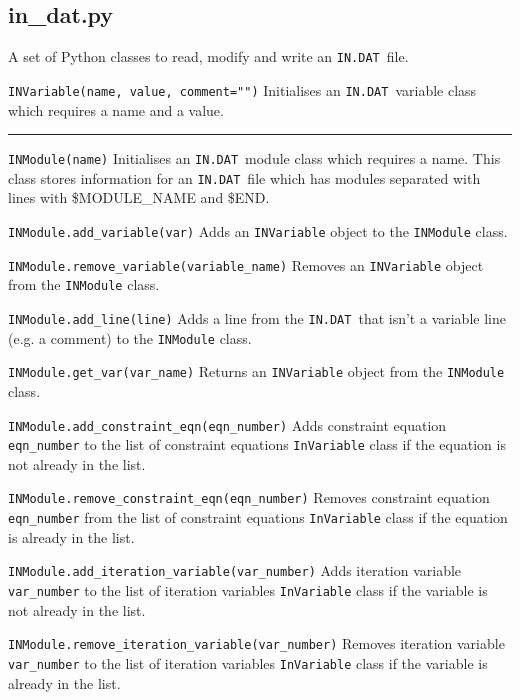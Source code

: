 \documentclass[11pt,a4paper]{article}
\newcommand{\indat}{\mbox{\texttt{IN.DAT}}}
\begin{document}
\subsection{in\_dat.py}

A set of Python classes to read, modify and write an \indat\ file.

\begin{description}

\item{\verb|INVariable(name, value, comment="")| } Initialises an \indat\
  variable class which requires a name and a value.

\end{description}

\rule{\textwidth}{0.4pt}

\begin{description}

\item{\verb|INModule(name)|} Initialises an \indat\ module class which
  requires a name. This class stores information for an \indat\ file which has
  modules separated with lines with \$MODULE\_NAME and \$END.

\item{\verb|INModule.add_variable(var)|} Adds an \verb|INVariable| object to
  the \verb|INModule| class.

\item{\verb|INModule.remove_variable(variable_name)|} Removes an
  \verb|INVariable| object from the \verb|INModule| class.

\item{\verb|INModule.add_line(line)|} Adds a line from the \indat\ that isn't
  a variable line (e.g. a comment) to the \verb|INModule| class.

\item{\verb|INModule.get_var(var_name)|} Returns an \verb|INVariable| object
  from the \verb|INModule| class.

\item{\verb|INModule.add_constraint_eqn(eqn_number)|} Adds constraint
  equation \verb|eqn_number| to the list of constraint equations
  \verb|InVariable| class if the equation is not already in the list.

\item{\verb|INModule.remove_constraint_eqn(eqn_number)|} Removes
  constraint equation \verb|eqn_number| from the list of constraint
  equations \verb|InVariable| class if the equation is already in the list.

\item{\verb|INModule.add_iteration_variable(var_number)|} Adds iteration
  variable \verb|var_number| to the list of iteration variables
  \verb|InVariable| class if the variable is not already in the list.

\item{\verb|INModule.remove_iteration_variable(var_number)|} Removes
  iteration variable \verb|var_number| to the list of iteration variables
  \verb|InVariable| class if the variable is already in the list.

\end{description}
\end{document}
